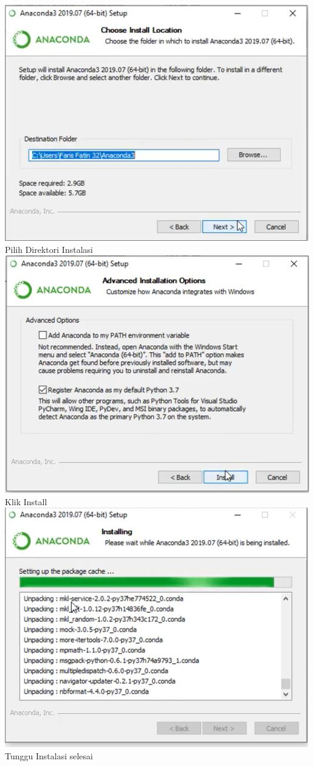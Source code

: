 \begin{enumerate}
\includegraphics{gambar/1_3.jpg}
Pilih Direktori Instalasi\\

\includegraphics{gambar/1_4.jpg}
Klik Install\\

\includegraphics{gambar/1_5.jpg}
Tunggu Instalasi selesai\\


\end{enumerate}
